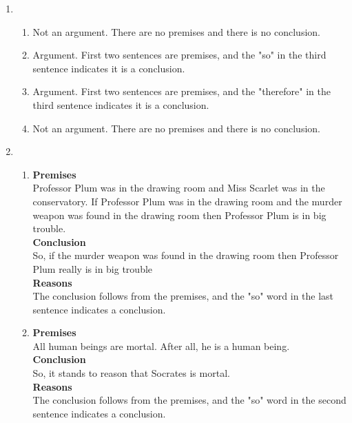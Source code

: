 \documentclass[a4paper,12pt]{article}
\begin{document}
    \begin{enumerate}[label=\arabic*,leftmargin=*]
        \item
            \nopagebreak
            \begin{enumerate}[label=\Alph*]
                \item Not an argument. There are no premises and there is no conclusion.
                \item Argument. First two sentences are premises, and the "so" in the third sentence indicates it is a conclusion.
                \item Argument. First two sentences are premises, and the "therefore" in the third sentence indicates it is a conclusion.
                \item Not an argument. There are no premises and there is no conclusion.
            \end{enumerate}

        \item
            \nopagebreak
            \begin{enumerate}[label=\Alph*]
                \item \textbf{Premises}\\
                    Professor Plum was in the drawing room and Miss Scarlet was in the conservatory. If Professor Plum was in the drawing room and the murder weapon was found in the drawing room then Professor Plum is in big trouble.\\
                    \textbf{Conclusion}\\
                    So, if the murder weapon was found in the drawing room then Professor Plum really is in big trouble\\
                    \textbf{Reasons}\\
                    The conclusion follows from the premises, and the "so" word in the last sentence indicates a conclusion.

                \item \textbf{Premises}\\
                    All human beings are mortal. After all, he is a human being.\\
                    \textbf{Conclusion}\\
                    So, it stands to reason that Socrates is mortal.\\
                    \textbf{Reasons}\\
                    The conclusion follows from the premises, and the "so" word in the second sentence indicates a conclusion.


\end{enumerate}
\end{enumerate}
\end{document}
